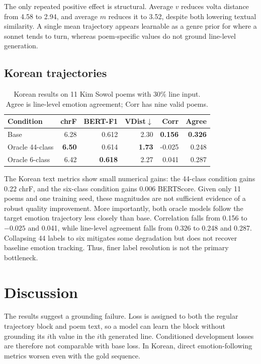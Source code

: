 \documentclass{article}
\begin{document}
The only repeated positive effect is structural. Average $v$ reduces volta distance from 4.58 to 2.94, and average $m$ reduces it to 3.52, despite both lowering textual similarity. A single mean trajectory appears learnable as a genre prior for where a sonnet tends to turn, whereas poem-specific values do not ground line-level generation.

\subsection{Korean trajectories}

\begin{table}[h!]
\caption{Korean results on 11 Kim Sowol poems with 30\% line input. Agree is line-level emotion agreement; Corr has nine valid poems.}
\label{tab:korean}
\centering
\small
\begin{tabular}{lrrrrr}
\toprule
Condition & chrF & BERT-F1 & VDist$\downarrow$ & Corr & Agree \\
\midrule
Base & 6.28 & 0.612 & 2.30 & \textbf{0.156} & \textbf{0.326} \\
Oracle 44-class & \textbf{6.50} & 0.614 & \textbf{1.73} & -0.025 & 0.248 \\
Oracle 6-class & 6.42 & \textbf{0.618} & 2.27 & 0.041 & 0.287 \\
\bottomrule
\end{tabular}
\end{table}

The Korean text metrics show small numerical gains: the 44-class condition gains 0.22 chrF, and the six-class condition gains 0.006 BERTScore. Given only 11 poems and one training seed, these magnitudes are not sufficient evidence of a robust quality improvement. More importantly, both oracle models follow the target emotion trajectory less closely than base. Correlation falls from 0.156 to $-0.025$ and 0.041, while line-level agreement falls from 0.326 to 0.248 and 0.287. Collapsing 44 labels to six mitigates some degradation but does not recover baseline emotion tracking. Thus, finer label resolution is not the primary bottleneck.

\section{Discussion}

The results suggest a grounding failure. Loss is assigned to both the regular trajectory block and poem text, so a model can learn the block without grounding its $i$th value in the $i$th generated line. Conditioned development losses are therefore not comparable with base loss. In Korean, direct emotion-following metrics worsen even with the gold sequence.
\end{document}
